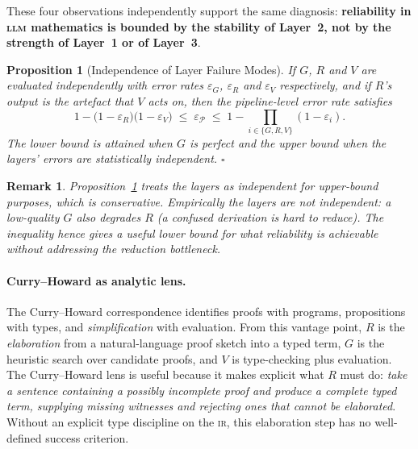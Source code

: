 \documentclass[11pt,a4paper]{article}
\newtheorem{proposition}{Proposition}
\newtheorem{remark}{Remark}
\newcommand{\LLM}{\textsc{llm}}
\newcommand{\IR}{\textsc{ir}}
\begin{document}
These four observations independently support the same diagnosis:
\textbf{reliability in \LLM{} mathematics is bounded by the
stability of Layer~2, not by the strength of Layer~1 or of
Layer~3}.

\begin{proposition}[Independence of Layer Failure Modes]
\label{prop:indep}
If $G$, $R$ and $V$ are evaluated independently with error rates
$\varepsilon_G$, $\varepsilon_R$ and $\varepsilon_V$ respectively,
and if $R$'s output is the artefact that $V$ acts on, then the
pipeline-level error rate satisfies
\[
  1 - \bigl(1-\varepsilon_R\bigr)\bigl(1-\varepsilon_V\bigr)
  \;\le\; \varepsilon_\mathcal{P}
  \;\le\; 1 - \prod_{i\in\{G,R,V\}}(1-\varepsilon_i).
\]
The lower bound is attained when $G$ is perfect and the upper bound
when the layers' errors are statistically independent. \quad $\square$
\end{proposition}

\begin{remark}
Proposition~\ref{prop:indep} treats the layers as independent for
upper-bound purposes, which is conservative.  Empirically the
layers are \emph{not} independent: a low-quality $G$ also
degrades $R$ (a confused derivation is hard to reduce).  The
inequality hence gives a useful \emph{lower} bound for what
reliability is achievable without addressing the reduction
bottleneck.
\end{remark}

\paragraph{Curry--Howard as analytic lens.}
The Curry--Howard correspondence \citep{howard1980formulastypes}
identifies proofs with programs, propositions with types, and
\emph{simplification} with evaluation.  From this vantage point,
$R$ is the \emph{elaboration} from a natural-language proof sketch
into a typed term, $G$ is the heuristic search over candidate
proofs, and $V$ is type-checking plus evaluation.  The Curry--Howard
lens is useful because it makes explicit what $R$ must do:
\emph{take a sentence containing a possibly incomplete proof and
produce a complete typed term, supplying missing witnesses and
rejecting ones that cannot be elaborated}.  Without an explicit
type discipline on the \IR, this elaboration step has no
well-defined success criterion.

\end{document}
